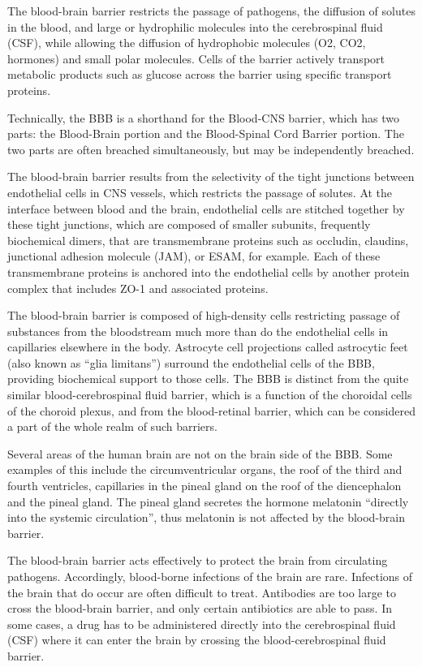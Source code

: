 The blood-brain barrier restricts the passage of pathogens, the diffusion of solutes in the blood, and large or hydrophilic molecules into the cerebrospinal fluid (CSF), while allowing the diffusion of hydrophobic molecules (O2, CO2, hormones) and small polar molecules. Cells of the barrier actively transport metabolic products such as glucose across the barrier using specific transport proteins.

Technically, the BBB is a shorthand for the Blood-CNS barrier, which has two parts: the Blood-Brain portion and the Blood-Spinal Cord Barrier portion. The two parts are often breached simultaneously, but may be independently breached.

The blood-brain barrier results from the selectivity of the tight junctions between endothelial cells in CNS vessels, which restricts the passage of solutes. At the interface between blood and the brain, endothelial cells are stitched together by these tight junctions, which are composed of smaller subunits, frequently biochemical dimers, that are transmembrane proteins such as occludin, claudins, junctional adhesion molecule (JAM), or ESAM, for example. Each of these transmembrane proteins is anchored into the endothelial cells by another protein complex that includes ZO-1 and associated proteins.

The blood-brain barrier is composed of high-density cells restricting passage of substances from the bloodstream much more than do the endothelial cells in capillaries elsewhere in the body. Astrocyte cell projections called astrocytic feet (also known as ``glia limitans'') surround the endothelial cells of the BBB, providing biochemical support to those cells. The BBB is distinct from the quite similar blood-cerebrospinal fluid barrier, which is a function of the choroidal cells of the choroid plexus, and from the blood-retinal barrier, which can be considered a part of the whole realm of such barriers.

Several areas of the human brain are not on the brain side of the BBB. Some examples of this include the circumventricular organs, the roof of the third and fourth ventricles, capillaries in the pineal gland on the roof of the diencephalon and the pineal gland. The pineal gland secretes the hormone melatonin ``directly into the systemic circulation'', thus melatonin is not affected by the blood-brain barrier.

The blood-brain barrier acts effectively to protect the brain from circulating pathogens. Accordingly, blood-borne infections of the brain are rare. Infections of the brain that do occur are often difficult to treat. Antibodies are too large to cross the blood-brain barrier, and only certain antibiotics are able to pass. In some cases, a drug has to be administered directly into the cerebrospinal fluid (CSF) where it can enter the brain by crossing the blood-cerebrospinal fluid barrier.

